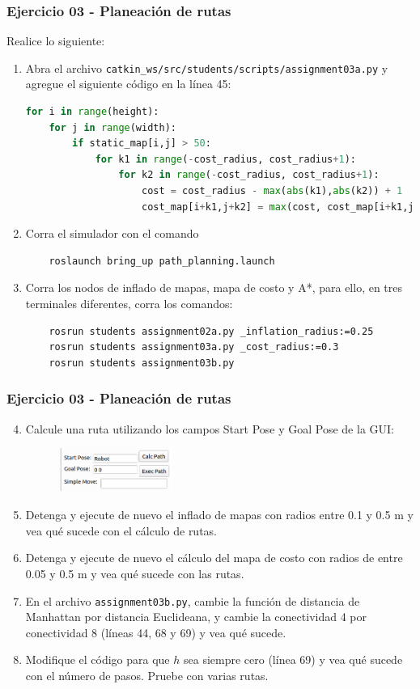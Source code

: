 \begin{frame}[containsverbatim]\frametitle{Ejercicio 03 - Planeación de rutas}
  Realice lo siguiente:
  \begin{enumerate}
     \item Abra el archivo \texttt{catkin\_ws/src/students/scripts/assignment03a.py} y agregue el siguiente código en la línea 45:
  \begin{lstlisting}[language=Python,firstnumber=45]
for i in range(height):
    for j in range(width):
        if static_map[i,j] > 50:
            for k1 in range(-cost_radius, cost_radius+1):
                for k2 in range(-cost_radius, cost_radius+1):
                    cost = cost_radius - max(abs(k1),abs(k2)) + 1
                    cost_map[i+k1,j+k2] = max(cost, cost_map[i+k1,j+k2])
                  \end{lstlisting}
  \item Corra el simulador con el comando
\begin{verbatim}
    roslaunch bring_up path_planning.launch
\end{verbatim}                  
  \item Corra los nodos de inflado de mapas, mapa de costo y A*, para ello, en tres terminales diferentes, corra los comandos:
\begin{verbatim}
    rosrun students assignment02a.py _inflation_radius:=0.25
    rosrun students assignment03a.py _cost_radius:=0.3
    rosrun students assignment03b.py
\end{verbatim}
  \end{enumerate}
\end{frame}

\begin{frame}\frametitle{Ejercicio 03 - Planeación de rutas}
  \begin{enumerate}
    \setcounter{enumi}{3}
  \item Calcule una ruta utilizando los campos Start Pose y Goal Pose de la GUI:
    \begin{figure}
      \centering
      \includegraphics[width=0.35\textwidth]{Figures/GUIPathPlanning.png}
    \end{figure}
  \item Detenga y ejecute de nuevo el inflado de mapas con radios entre 0.1 y 0.5 m y vea qué sucede con el cálculo de rutas.
  \item Detenga y ejecute de nuevo el cálculo del mapa de costo con radios de entre 0.05 y 0.5 m y vea qué sucede con las rutas. 
  \item En el archivo \texttt{assignment03b.py}, cambie la función de distancia de Manhattan por distancia Euclideana, y cambie la conectividad 4 por conectividad 8 (líneas 44, 68 y 69) y vea qué sucede.
  \item Modifique el código para que $h$ sea siempre cero (línea 69) y vea qué sucede con el número de pasos. Pruebe con varias rutas. 
  \end{enumerate}
\end{frame}

